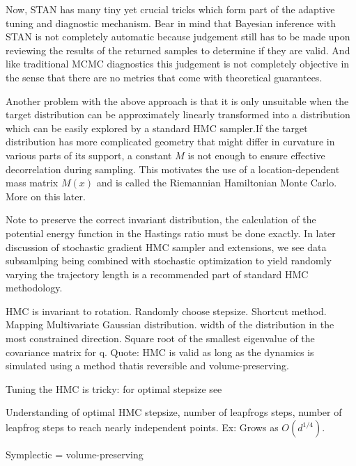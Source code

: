 \documentclass[12pt]{report}
\begin{document}
Now, STAN has many tiny yet crucial tricks which form part of the adaptive
tuning and diagnostic mechanism. Bear in mind that Bayesian inference with STAN is not completely
automatic because judgement still has to be made upon reviewing the results of
the returned samples to determine if they are valid. And like traditional MCMC
diagnostics this judgement is not completely objective in the sense that there
are no metrics that come with theoretical guarantees. 





Another problem with the above approach is that it is only unsuitable when the
target distribution can be approximately linearly transformed into a
distribution which can be easily explored by a standard HMC sampler.If the target
distribution has more complicated geometry that might differ in
curvature in various parts of its support, a constant $M$ is not enough to ensure
effective decorrelation during sampling. This motivates the use of
a location-dependent mass matrix $M(x)$ and is called the Riemannian Hamiltonian
Monte Carlo. More on this later. 






Note to preserve the correct invariant distribution, the calculation of the
potential energy function in the Hastings ratio must be done exactly. In later
discussion of stochastic gradient HMC sampler and extensions, we see data
subsamlping being combined with stochastic optimization to yield 
randomly varying the trajectory length is a recommended part of standard HMC
methodology. 

HMC is invariant to rotation.
Randomly choose stepsize. 
Shortcut method.
Mapping Multivariate Gaussian distribution. width of the distribution in the most constrained direction. Square root of the smallest eigenvalue of the covariance matrix for q.
Quote: HMC is valid as long as the dynamics is simulated using a method thatis reversible and volume-preserving. 

Tuning the HMC is tricky: for optimal stepsize see \cite{beskos2013optimal}

Understanding of optimal HMC stepsize, number of leapfrogs steps, number of leapfrog steps to reach nearly independent points.
Ex: Grows as $O(d^{1/4})$.







Symplectic  = volume-preserving
\end{document}
